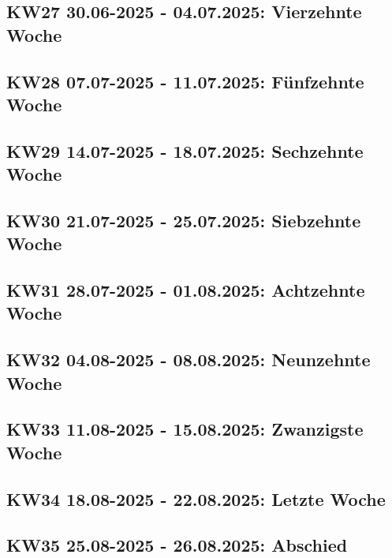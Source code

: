 \subsection{KW27 30.06-2025 - 04.07.2025: Vierzehnte Woche}


\subsection{KW28 07.07-2025 - 11.07.2025: Fünfzehnte Woche}


\subsection{KW29 14.07-2025 - 18.07.2025: Sechzehnte Woche}


\subsection{KW30 21.07-2025 - 25.07.2025: Siebzehnte Woche}


\subsection{KW31 28.07-2025 - 01.08.2025: Achtzehnte Woche}


\subsection{KW32 04.08-2025 - 08.08.2025: Neunzehnte Woche}


\subsection{KW33 11.08-2025 - 15.08.2025: Zwanzigste Woche}


\subsection{KW34 18.08-2025 - 22.08.2025: Letzte Woche}


\subsection{KW35 25.08-2025 - 26.08.2025: Abschied}
